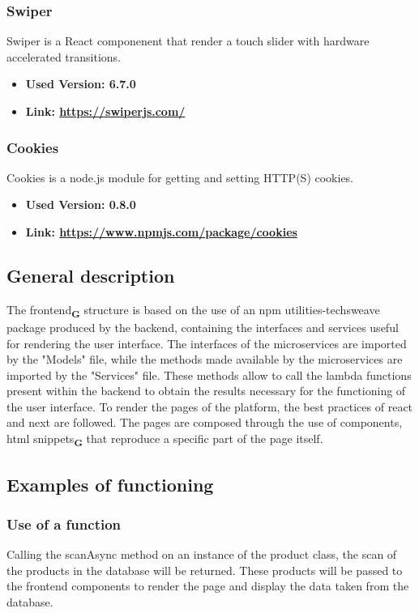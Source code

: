 \subsubsection{Swiper}
Swiper is a React componenent that render a touch slider with hardware accelerated transitions.
\begin{itemize}
  \item \textbf{Used Version: 6.7.0}
  \item \textbf{Link: \url{https://swiperjs.com/}}
\end{itemize}
\subsubsection{Cookies}
Cookies is a node.js module for getting and setting HTTP(S) cookies.
\begin{itemize}
  \item \textbf{Used Version: 0.8.0}
  \item \textbf{Link: \url{https://www.npmjs.com/package/cookies}}
\end{itemize}
\subsection{General description}
The frontend\textsubscript{\textbf{G}} structure is based on the use of an npm utilities-techsweave package produced by the backend, containing the interfaces and services useful for rendering the user interface. The interfaces of the microservices are imported by the "Models" file, while the methods made available by the microservices are imported by the "Services" file. These methods allow to call the lambda functions present within the backend to obtain the results necessary for the functioning of the user interface. To render the pages of the platform, the best practices of react and next are followed. The pages are composed through the use of components, html snippets\textsubscript{\textbf{G}} that reproduce a specific part of the page itself.
\subsection{Examples of functioning}
\subsubsection{Use of a function}
Calling the scanAsync method on an instance of the product class, the scan of the products in the database will be returned. These products will be passed to the frontend components to render the page and display the data taken from the database.
